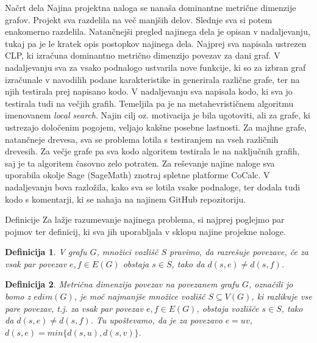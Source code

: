 \documentclass[12pt,a4paper]{amsart}
\makeatletter
\renewcommand\section{\@startsection{section}{1}%
  \z@{.5\linespacing\@plus.7\linespacing}{.5\linespacing}%
  {\normalfont\scshape\large\centering}}
\theoremstyle{plain} %
\newtheorem{definicija}{Definicija}[section]
\makeatother
\begin{document}
\section{Načrt dela}
    Najina projektna naloga se nanaša dominantne metrične dimenzije grafov. Projekt sva razdelila na več manjših delov.
    Slednje sva si potem enakomerno razdelila. Natančnejši pregled najinega dela je opisan v nadaljevanju, tukaj pa je le 
    kratek opis postopkov najinega dela.
    Najprej sva napisala ustrezen CLP, ki izračuna dominantno metrično dimenzijo povezav za dani graf. V nadaljevanju sva 
    za vsako podnalogo ustvarila nove funkcije, ki so za izbran graf izračunale v navodilih podane karakteristike in generirala
    različne grafe, ter na njih testirala prej napisano kodo. 
    V nadaljevanju sva napisala kodo, ki sva jo testirala tudi na večjih grafih. Temeljila pa je na metahevrističnem
    algoritmu imenovanem \emph{local search}. 
    Najin cilj oz. motivacija je bila ugotoviti, ali za grafe, ki ustrezajo določenim pogojem, veljajo kakšne posebne lastnosti.
    Za majhne grafe, natančneje drevesa, sva se problema lotila s testiranjem na vseh različnih drevesih. Za večje grafe
    pa sva kodo algoritem testirala le na naključnih grafih, saj je ta algoritem časovno zelo potraten. 
    Za reševanje najine naloge sva uporabila okolje Sage (SageMath) znotraj spletne platforme CoCalc. V nadaljevanju bova razložila,
    kako sva se lotila vsake podnaloge, ter dodala tudi kodo s komentarji, ki se nahaja na najinem GitHub repozitoriju.
\bigskip
    
\section{Definicije}
    Za lažje razumevanje najinega problema, si najprej poglejmo par pojmov ter definicij, ki sva jih uporabljala v sklopu najine
    projekne naloge.
    \begin{definicija}
        V grafu $G$, množici vozlišč $S$ pravimo, da razrešuje povezave, če za vsak par povezav $e, f \in E(G)$ obstaja $s \in S$, tako da $d(s, e) \neq  d(s, f)$.
    \end{definicija}

    \begin{definicija}
        Metrična dimenzija povezav na  povezanem grafu $G$, označili jo bomo z $edim(G)$, je moč najmanjše množice vozlišč $S\subseteq V(G)$, ki razlikuje vse pare povezav, t.j. za vsak par povezav $e, f \in E(G)$, obstaja vozlišče $s \in S$, tako da $d(s, e) \neq d(s, f )$. Tu upoštevamo, da je za povezavo $e=uv$, $d(s, e) = min\{d(s, u), d(s, v)\}$.
    \end{definicija}
        
\end{document}
